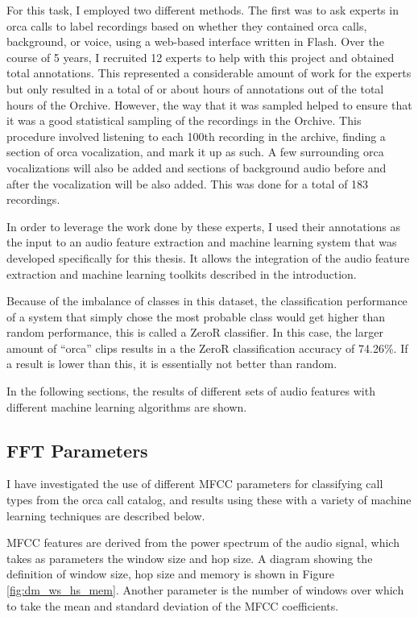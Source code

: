 \documentclass[12pt,oneside]{book}
\begin{document}
For this task, I employed two different methods.  The first was to
ask experts in orca calls to label recordings based on whether they
contained orca calls, background, or voice, using a web-based
interface written in Flash.  Over the course of 5 years, I recruited
12 experts to help with this project and obtained \totalAnnotations
total annotations.  This represented a considerable amount of work for
the experts but only resulted in a total of \totalAnnotationsGB or
about \totalAnnotationsTimeHours hours of annotations out of the total
\totalHoursOfOrchiveRecordings hours of the Orchive.  However, the way
that it was sampled helped to ensure that it was a good statistical
sampling of the recordings in the Orchive.  This procedure involved
listening to each 100th recording in the archive, finding a section of
orca vocalization, and mark it up as such.  A few surrounding orca
vocalizations will also be added and sections of background audio
before and after the vocalization will be also added.  This was done
for a total of 183 recordings.

In order to leverage the work done by these experts, I used their
annotations as the input to an audio feature extraction and machine
learning system that was developed specifically for this thesis.  It
allows the integration of the audio feature extraction and machine
learning toolkits described in the introduction.

Because of the imbalance of classes in this dataset, the
classification performance of a system that simply chose the most
probable class would get higher than random performance, this is
called a ZeroR classifier.  In this case, the larger amount of
``orca'' clips results in a the ZeroR classification accuracy of
74.26\%.  If a result is lower than this, it is essentially not better
than random.

In the following sections, the results of different sets of audio
features with different machine learning algorithms are shown.  

%
%
\subsection{FFT Parameters}

I have investigated the use of different MFCC parameters for
classifying call types from the orca call catalog, and results using these
with a variety of machine learning techniques are described below.

MFCC features are derived from the power spectrum of the audio signal,
which takes as parameters the window size and hop size.  A diagram
showing the definition of window size, hop size and memory is shown in
Figure \ref{fig:dm_ws_hs_mem}. Another parameter is the number of
windows over which to take the mean and standard deviation of the MFCC
coefficients.
\end{document}

